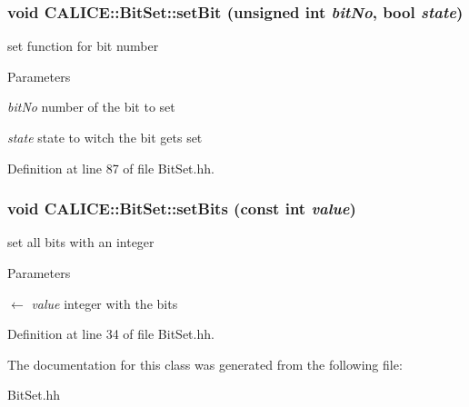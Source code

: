\subsubsection[{setBit}]{\setlength{\rightskip}{0pt plus 5cm}void CALICE::BitSet::setBit (unsigned int {\em bitNo}, \/  bool {\em state})\hspace{0.3cm}{\ttfamily  [inline, protected]}}\label{classCALICE_1_1BitSet_ae1b313a2e4a97fd9f197239f4abb9a49}


set function for bit number 
\begin{DoxyParams}{Parameters}
\item[{\em bitNo}]number of the bit to set \item[{\em state}]state to witch the bit gets set \end{DoxyParams}


Definition at line 87 of file BitSet.hh.
\subsubsection[{setBits}]{\setlength{\rightskip}{0pt plus 5cm}void CALICE::BitSet::setBits (const int {\em value})\hspace{0.3cm}{\ttfamily  [inline]}}\label{classCALICE_1_1BitSet_a17ed04fb84b1be0b476312d046333704}


set all bits with an integer 
\begin{DoxyParams}{Parameters}
\item[\mbox{$\leftarrow$} {\em value}]integer with the bits \end{DoxyParams}


Definition at line 34 of file BitSet.hh.

The documentation for this class was generated from the following file:\begin{DoxyCompactItemize}
\item 
BitSet.hh\end{DoxyCompactItemize}
